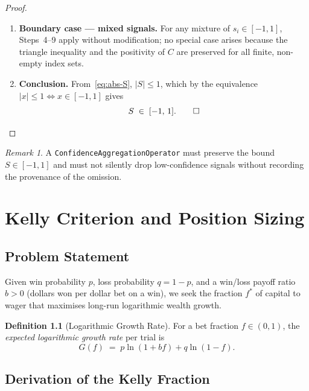 \documentclass[12pt,openany]{book}
\numberwithin{equation}{chapter}
\theoremstyle{plain}
\theoremstyle{definition}
\newtheorem{definition}[theorem]{Definition}
\theoremstyle{remark}
\newtheorem{remark}[theorem]{Remark}
\numberwithin{equation}{chapter}
\theoremstyle{plain}
\begin{document}
\begin{proof}
\begin{enumerate}
  \item \textbf{Boundary case --- mixed signals.}
        For any mixture of $s_i \in [-1, 1]$, Steps~4--9 apply without
        modification; no special case arises because the triangle inequality
        and the positivity of $C$ are preserved for all finite, non-empty
        index sets.

  \item \textbf{Conclusion.}
        From~\eqref{eq:abs-S}, $|S| \leq 1$, which by the equivalence
        $|x| \leq 1 \Leftrightarrow x \in [-1, 1]$ gives
        \begin{equation}
          S \;\in\; [-1,\, 1]. \qed
        \end{equation}
\end{enumerate}
\end{proof}

\begin{remark}
A \texttt{ConfidenceAggregationOperator} must preserve the bound
$S \in [-1, 1]$ and must not silently drop low-confidence signals without
recording the provenance of the omission.
\end{remark}

\chapter{Kelly Criterion and Position Sizing}
\label{ch:kelly}

\section{Problem Statement}

Given win probability $p$, loss probability $q = 1 - p$, and a
win/loss payoff ratio $b > 0$ (dollars won per dollar bet on a win), we
seek the fraction $f^{*}$ of capital to wager that maximises long-run
logarithmic wealth growth.

\begin{definition}[Logarithmic Growth Rate]
\label{def:log-growth}
For a bet fraction $f \in (0, 1)$, the \emph{expected logarithmic growth
rate} per trial is
\begin{equation}
  G(f) \;=\; p\ln(1 + bf) + q\ln(1 - f).
  \label{eq:log-growth}
\end{equation}
\end{definition}

\section{Derivation of the Kelly Fraction}
\end{document}
